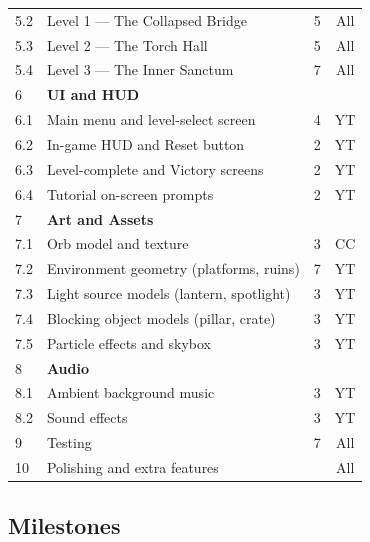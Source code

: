 \documentclass[11pt, letterpaper]{article}
\begin{document}
\begin{center}
\begin{tabular}{p{0.7cm} p{7.2cm} c c}
    5.2 & Level 1 --- The Collapsed Bridge                   & 5  & All     \\
    5.3 & Level 2 --- The Torch Hall                         & 5  & All     \\
    5.4 & Level 3 --- The Inner Sanctum                      & 7  & All     \\
    \hline
    6   & \textbf{UI and HUD}                                &    &        \\
    \hline
    6.1 & Main menu and level-select screen                  & 4  & YT     \\
    6.2 & In-game HUD and Reset button                       & 2  & YT     \\
    6.3 & Level-complete and Victory screens                 & 2  & YT     \\
    6.4 & Tutorial on-screen prompts                         & 2  & YT     \\
    \hline
    7   & \textbf{Art and Assets}                            &    &        \\
    \hline
    7.1 & Orb model and texture                              & 3  & CC     \\
    7.2 & Environment geometry (platforms, ruins)            & 7  & YT     \\
    7.3 & Light source models (lantern, spotlight)           & 3  & YT     \\
    7.4 & Blocking object models (pillar, crate)             & 3  & YT     \\
    7.5 & Particle effects and skybox                        & 3  & YT     \\
    \hline
    8   & \textbf{Audio}                                     &    &        \\
    \hline
    8.1 & Ambient background music                           & 3  & YT     \\
    8.2 & Sound effects                                      & 3  & YT     \\
    \hline
    9   & Testing                                            & 7  & All    \\
    \hline
    10  & Polishing and extra features                       &    & All    \\
    \hline
    \end{tabular}
    \end{center}

    \subsection{Milestones}
\end{document}
